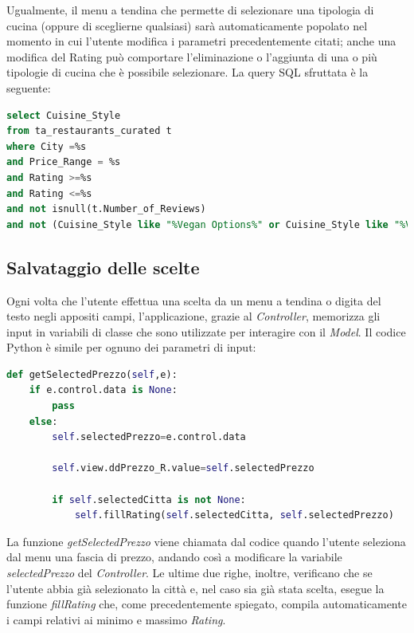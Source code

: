 \documentclass{report}
\begin{document}
Ugualmente, il menu a tendina che permette di selezionare una tipologia di cucina (oppure di sceglierne qualsiasi) sarà automaticamente popolato nel momento in cui l'utente modifica i parametri precedentemente citati; anche una modifica del Rating può comportare l'eliminazione o l'aggiunta di una o più tipologie di cucina che è possibile selezionare. La query SQL sfruttata è la seguente:
\begin{lstlisting}[language=SQL, caption={Query SQL per estrarre le tipologie di cucina}]
select Cuisine_Style 
from ta_restaurants_curated t
where City =%s
and Price_Range = %s
and Rating >=%s
and Rating <=%s
and not isnull(t.Number_of_Reviews)
and not (Cuisine_Style like "%Vegan Options%" or Cuisine_Style like "%Vegetarian Friendly%" or Cuisine_Style like "%Gluten Free Options%")
\end{lstlisting}

\subsection{Salvataggio delle scelte}\label{sec2_eventi}
Ogni volta che l'utente effettua una scelta da un menu a tendina o digita del testo negli appositi campi, l'applicazione, grazie al \textit{Controller}, memorizza gli input in variabili di classe che sono utilizzate per interagire con il \textit{Model}. Il codice Python è simile per ognuno dei parametri di input:
\begin{lstlisting}[language=Python,caption=Codice per memorizzare input dell'utente]
def getSelectedPrezzo(self,e):
    if e.control.data is None:
        pass
    else:
        self.selectedPrezzo=e.control.data

        self.view.ddPrezzo_R.value=self.selectedPrezzo

        if self.selectedCitta is not None:
            self.fillRating(self.selectedCitta, self.selectedPrezzo)
\end{lstlisting}
La funzione \textit{getSelectedPrezzo} viene chiamata dal codice quando l'utente seleziona dal menu una fascia di prezzo, andando così a modificare la variabile \textit{selectedPrezzo} del \textit{Controller}. Le ultime due righe, inoltre, verificano che se l'utente abbia già selezionato la città e, nel caso sia già stata scelta, esegue la funzione \textit{fillRating} che, come precedentemente spiegato, compila automaticamente i campi relativi ai minimo e massimo \textit{Rating}.
\end{document}

